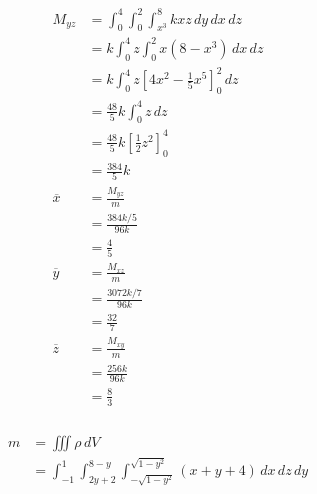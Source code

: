 \documentclass{article}
\begin{document}
\begin{align*}
  M_{y z}      & = \int_0^4 \int_0^2 \int_{x^3}^8 k x z \,dy \,dx \,dz          \\
               & = k \int_0^4 z \int_0^2 x (8 - x^3) \,dx \,dz                  \\
               & = k \int_0^4 z \left[ 4 x^2 - \frac{1}{5} x^5 \right]_0^2 \,dz \\
               & = \frac{48}{5} k \int_0^4 z \,dz                               \\
               & = \frac{48}{5} k \left[ \frac{1}{2} z^2 \right]_0^4            \\
               & = \frac{384}{5} k                                              \\
  \overline{x} & = \frac{M_{y z}}{m}                                            \\
               & = \frac{384 k / 5}{96 k}                                       \\
               & = \frac{4}{5}                                                  \\
  \overline{y} & = \frac{M_{x z}}{m}                                            \\
               & = \frac{3072 k / 7}{96 k}                                      \\
               & = \frac{32}{7}                                                 \\
  \overline{z} & = \frac{M_{x y}}{m}                                            \\
               & = \frac{256 k}{96 k}                                           \\
               & = \frac{8}{3}
\end{align*}

\setcounter{subsubsection}{28}
\subsubsection{}

\begin{align*}
  m & = \iiint \rho \,dV                                                                                      \\
    & = \int_{-1}^1 \int_{2 y + 2}^{8 - y} \int_{-\sqrt{1 - y^2}}^{\sqrt{1 - y^2}} (x + y + 4) \,dx \,dz \,dy
\end{align*}

\setcounter{subsubsection}{34}
\subsubsection{}
\end{document}
